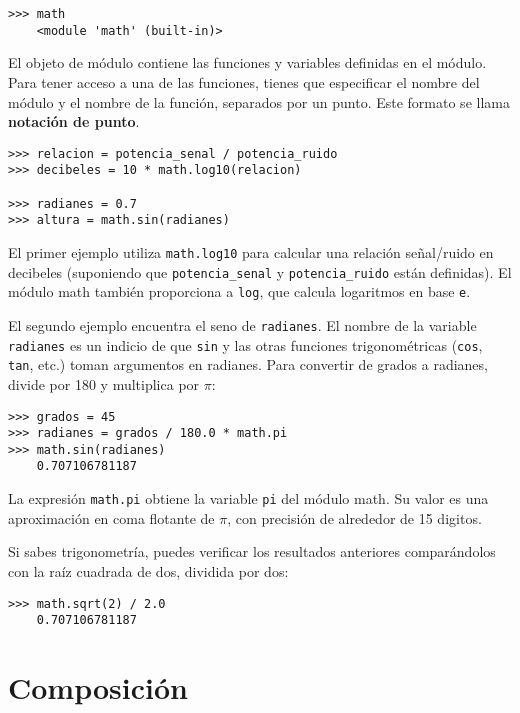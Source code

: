 \documentclass[10pt]{book}
\begin{document}
\begin{verbatim}
>>> math
    <module 'math' (built-in)>
\end{verbatim}
%
El objeto de módulo contiene las funciones y variables definidas en el
módulo. Para tener acceso a una de las funciones, tienes que especificar el nombre
del módulo y el nombre de la función, separados por un punto.
Este formato se llama {\bf notación de punto}.

\begin{verbatim}
>>> relacion = potencia_senal / potencia_ruido
>>> decibeles = 10 * math.log10(relacion)

>>> radianes = 0.7
>>> altura = math.sin(radianes)
\end{verbatim}
%
El primer ejemplo utiliza \verb"math.log10" para calcular
una relación señal/ruido en decibeles (suponiendo que \verb"potencia_senal" y
\verb"potencia_ruido" están definidas).  El módulo math también proporciona a {\tt log},
que calcula logaritmos en base {\tt e}.

El segundo ejemplo encuentra el seno de {\tt radianes}.  El nombre de la variable {\tt radianes} es un indicio de que {\tt sin} y las otras funciones
trigonométricas ({\tt cos}, {\tt tan}, etc.)  toman argumentos en radianes. Para
convertir de grados a radianes, divide por 180 y multiplica por
$\pi$:

\begin{verbatim}
>>> grados = 45
>>> radianes = grados / 180.0 * math.pi
>>> math.sin(radianes)
    0.707106781187
\end{verbatim}
%
La expresión {\tt math.pi} obtiene la variable {\tt pi} del módulo
math.  Su valor es una aproximación en coma flotante
de $\pi$, con precisión de alrededor de 15 digitos.

Si sabes
trigonometría, puedes verificar los resultados anteriores comparándolos con
la raíz cuadrada de dos, dividida por dos:

\begin{verbatim}
>>> math.sqrt(2) / 2.0
    0.707106781187
\end{verbatim}
%

\section{Composición}
\end{document}

